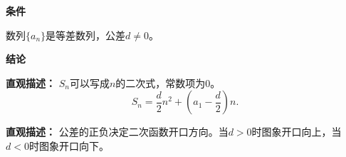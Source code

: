 \begin{statementbox}
	\textbf{\textcolor{CStatement}{条件}}
	\begin{description}[style=nextline, leftmargin=2.8em, labelsep=0.5em, itemsep=0.35em]
		\item[\textbf{\textcolor{CStatement}{条件 1（等差非零差）：}}] 数列$\{a_n\}$是等差数列，公差$d \neq 0$。
	\end{description}

	\textbf{\textcolor{CStatement}{结论}}
	\begin{description}[style=nextline, leftmargin=2.8em, labelsep=0.5em, itemsep=0.45em]
		\item[\textbf{\textcolor{CStatement}{结论一（二次函数形式）：}}]
			\textbf{\textcolor{CStatement}{直观描述：}}
			$S_n$可以写成$n$的二次式，常数项为$0$。
			\[
				S_n = \frac{d}{2}n^2 + \left(a_1 - \frac{d}{2}\right)n.
			\]

		\item[\textbf{\textcolor{CStatement}{推广结论（开口方向）：}}]
			\textbf{\textcolor{CStatement}{直观描述：}}
			公差的正负决定二次函数开口方向。当$d>0$时图象开口向上，当$d<0$时图象开口向下。
	\end{description}
\end{statementbox}
